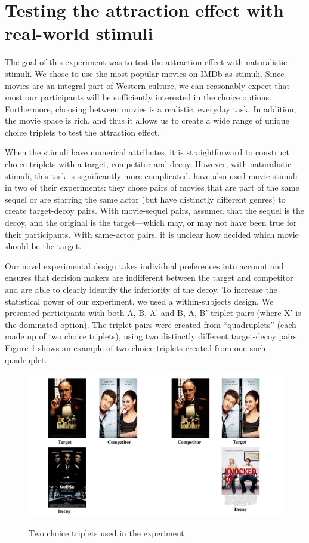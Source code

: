 \documentclass[12pt, a4paper]{article}
\begin{document}
\section*{Testing the attraction effect with real-world stimuli}

The goal of this experiment was to test the attraction effect with naturalistic stimuli. We chose to use the most popular movies on IMDb as stimuli. Since movies are an integral part of Western culture, we can reasonably expect that most our participants will be sufficiently interested in the choice options. Furthermore, choosing between movies is a realistic, everyday task. In addition, the movie space is rich, and thus it allows us to create a wide range of unique choice triplets to test the attraction effect.

When the stimuli have numerical attributes, it is straightforward to construct choice triplets with a target, competitor and decoy. However, with naturalistic stimuli, this task is significantly more complicated.  have also used movie stimuli in two of their experiments: they chose pairs of movies that are part of the same sequel or are starring the same actor (but have distinctly different genres) to create target-decoy pairs. With movie-sequel pairs, \citeauthor{Frederick2014} assumed that the sequel is the decoy, and the original is the target---which may, or may not have been true for their participants. With same-actor pairs, it is unclear how \citeauthor{Frederick2014} decided which movie should be the target.

Our novel experimental design takes individual preferences into account and ensures that decision makers are indifferent between the target and competitor and are able to clearly identify the inferiority of the decoy. To increase the statistical power of our experiment, we used a within-subjects design. We presented participants with both A, B, A' and B, A, B' triplet pairs (where X' is the dominated option). The triplet pairs were created from ``quadruplets'' (each made up of two choice triplets), using two distinctly different target-decoy pairs. Figure \ref{fig:quadruplets} shows an example of two choice triplets created from one such quadruplet.


\begin{figure}
\centering
\captionsetup{justification=centering}
		 \caption{Two choice triplets used in the experiment}
\includegraphics[width=1\textwidth]{figure1.pdf}
\label{fig:quadruplets}
\end{figure}
\end{document}
